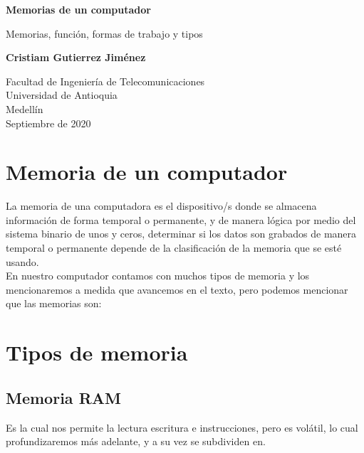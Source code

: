 \documentclass{article}
\begin{document}
\begin{titlepage}
    \begin{center}
        \vspace*{1cm}
            
        \Huge
        \textbf{Memorias de un computador}
            
        \vspace{0.5cm}
        \LARGE
        Memorias, función, formas de trabajo y tipos
            
        \vspace{1.5cm}
            
        \textbf{Cristiam Gutierrez Jiménez}
            
        \vfill
            
        \vspace{0.8cm}
            
        \Large
        Facultad de Ingeniería de Telecomunicaciones\\
        Universidad de Antioquia\\
        Medellín\\
        Septiembre de 2020
            
    \end{center}
\end{titlepage}

\tableofcontents

\section{Memoria de un computador}

La memoria de una computadora es el dispositivo/s donde se almacena información de forma temporal o permanente, y de manera lógica por medio del sistema binario de unos y ceros, determinar si los datos son grabados de manera temporal o permanente depende de la clasificación de la memoria que se esté usando.\cite{NormaIPC}\\

En nuestro computador contamos con muchos tipos de memoria y los mencionaremos a medida que avancemos en el texto, pero podemos mencionar que las memorias son:

\section{Tipos de memoria}



\subsection{Memoria RAM}
Es la cual nos permite la lectura escritura e instrucciones, pero es volátil, lo cual profundizaremos más adelante, y a su vez se subdividen en.
\end{document}
